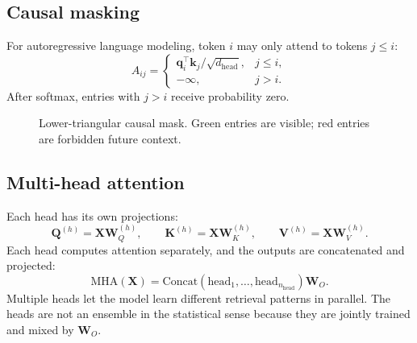 \documentclass[11pt,a4paper]{article}
\theoremstyle{definition}
\theoremstyle{plain}
\newcommand{\vq}{\bm{q}}
\newcommand{\vk}{\bm{k}}
\newcommand{\mW}{\bm{W}}
\newcommand{\mQ}{\bm{Q}}
\newcommand{\mK}{\bm{K}}
\newcommand{\mV}{\bm{V}}
\newcommand{\mX}{\bm{X}}
\newcommand{\dhead}{d_{\mathrm{head}}}
\newcommand{\nhead}{n_{\mathrm{head}}}
\begin{document}
\subsection{Causal masking}

For autoregressive language modeling, token $i$ may only attend to tokens $j\leq i$:
\begin{equation}\label{eq:causal_mask}
    A_{ij}=\begin{cases}
        \vq_i^\top\vk_j/\sqrt{\dhead}, & j\leq i,\\
        -\infty, & j>i.
    \end{cases}
\end{equation}
After softmax, entries with $j>i$ receive probability zero.

\begin{figure}[H]
\centering
{}
\caption{Lower-triangular causal mask. Green entries are visible; red entries are forbidden future context.}
\label{fig:causal-mask}
\end{figure}

\subsection{Multi-head attention}

Each head has its own projections:
\begin{equation}
    \mQ^{(h)}=\mX\mW_Q^{(h)},
    \qquad
    \mK^{(h)}=\mX\mW_K^{(h)},
    \qquad
    \mV^{(h)}=\mX\mW_V^{(h)}.
\end{equation}
Each head computes attention separately, and the outputs are concatenated and projected:
\begin{equation}\label{eq:mha}
    \mathrm{MHA}(\mX)=
    \mathrm{Concat}(\mathrm{head}_1,\ldots,\mathrm{head}_{\nhead})\mW_O.
\end{equation}
Multiple heads let the model learn different retrieval patterns in parallel. The heads are not an ensemble in the statistical sense because they are jointly trained and mixed by $\mW_O$.
\end{document}
